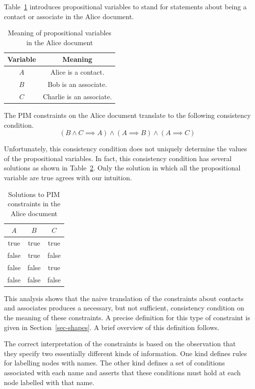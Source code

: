 \documentclass{article}
\begin{document}
Table~\ref{vars-meaning} introduces propositional variables to stand for statements about being a contact or associate
in the Alice document.
\begin{table}[h]
\begin{center}
\begin{tabular}{|c|c|}
\hline
Variable			& Meaning \\
\hline
$A$	& Alice is a contact. \\
$B$	& Bob is an associate. \\
$C$	& Charlie is an associate. \\
\hline
\end{tabular}
\end{center}
\caption{Meaning of propositional variables in the Alice document}
\label{vars-meaning}
\end{table}

The PIM constraints on the Alice document translate to the following consistency condition.
\[
(B \land C \implies A) \land (A \implies B) \land (A \implies C)
\]

Unfortunately, this consistency condition does not uniquely determine the values of the propositional variables.
In fact, this consistency condition has several solutions as shown in Table~\ref{sol-pim-constraints}.
Only the solution in which all the propositional variable are true agrees with our intuition.
\begin{table}[h]
\begin{center}
\begin{tabular}{|c|c|c|}
\hline
$A$	& $B$	& $C$  \\
\hline
true	& true	& true \\
false	& true	& false \\
false	& false	& true \\
false	& false	& false \\
\hline
\end{tabular}
\end{center}
\caption{Solutions to PIM constraints in the Alice document}
\label{sol-pim-constraints}
\end{table}

This analysis shows that the naive translation of the constraints about contacts and associates
produces a necessary, but not sufficient, consistency condition on the meaning of these constraints.
A precise definition for this type of constraint is given in Section~\ref{sec-shapes}. 
A brief overview of this definition follows.

The correct interpretation of the constraints is based on the observation that they specify two essentially different kinds of information. 
One kind defines rules for labelling nodes with names.
The other kind defines a set of conditions associated with each name and asserts that these conditions must hold at each node labelled with that name.
\end{document}

